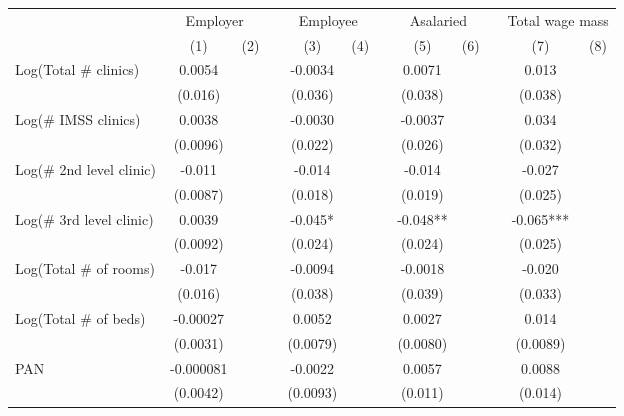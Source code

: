 \begin{tabular}{lccccccccccc}
\toprule
      & \multicolumn{2}{c}{Employer} &       & \multicolumn{2}{c}{Employee} &       & \multicolumn{2}{c}{Asalaried} &       & \multicolumn{2}{c}{Total wage mass} \\
\cmidrule{2-3}\cmidrule{5-6}\cmidrule{8-9}\cmidrule{11-12}      & (1)   & (2)   &       & (3)   & (4)   &       & (5)   & (6)   &       & (7)   & (8) \\
\midrule
\midrule
Log(Total \# clinics) & 0.0054 &       &       & -0.0034 &       &       & 0.0071 &       &       & 0.013 &  \\
      & (0.016) &       &       & (0.036) &       &       & (0.038) &       &       & (0.038) &  \\
Log(\# IMSS clinics) & 0.0038 &       &       & -0.0030 &       &       & -0.0037 &       &       & 0.034 &  \\
      & (0.0096) &       &       & (0.022) &       &       & (0.026) &       &       & (0.032) &  \\
Log(\# 2nd level clinic) & -0.011 &       &       & -0.014 &       &       & -0.014 &       &       & -0.027 &  \\
      & (0.0087) &       &       & (0.018) &       &       & (0.019) &       &       & (0.025) &  \\
Log(\# 3rd level clinic) & 0.0039 &       &       & -0.045* &       &       & -0.048** &       &       & -0.065*** &  \\
      & (0.0092) &       &       & (0.024) &       &       & (0.024) &       &       & (0.025) &  \\
Log(Total \# of rooms) & -0.017 &       &       & -0.0094 &       &       & -0.0018 &       &       & -0.020 &  \\
      & (0.016) &       &       & (0.038) &       &       & (0.039) &       &       & (0.033) &  \\
Log(Total \# of beds) & -0.00027 &       &       & 0.0052 &       &       & 0.0027 &       &       & 0.014 &  \\
      & (0.0031) &       &       & (0.0079) &       &       & (0.0080) &       &       & (0.0089) &  \\
PAN   & -0.000081 &       &       & -0.0022 &       &       & 0.0057 &       &       & 0.0088 &  \\
      & (0.0042) &       &       & (0.0093) &       &       & (0.011) &       &       & (0.014) &  \\

\end{tabular}

